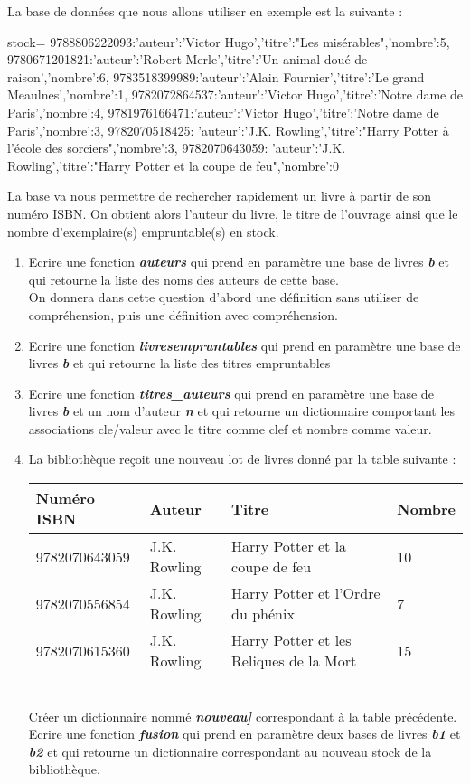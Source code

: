 \documentclass[12pt,french]{article}
\begin{document}
La base de données que nous allons utiliser en exemple est la suivante :
\small
\begin{tcolorbox}[enhanced,colback=blue!5!white,colframe=blue!75!black]	
\begin{pyverbatim}
stock={
9788806222093:{'auteur':'Victor Hugo','titre':"Les misérables",'nombre':5},
9780671201821:{'auteur':'Robert Merle','titre':'Un animal doué de raison','nombre':6},
9783518399989:{'auteur':'Alain Fournier','titre':'Le grand Meaulnes','nombre':1},
9782072864537:{'auteur':'Victor Hugo','titre':'Notre dame de Paris','nombre':4},
9781976166471:{'auteur':'Victor Hugo','titre':'Notre dame de Paris','nombre':3},               
9782070518425: {'auteur':'J.K. Rowling','titre':"Harry Potter à l'école des sorciers",'nombre':3},
9782070643059: {'auteur':'J.K. Rowling','titre':"Harry Potter et la coupe de feu",'nombre':0} 
}
\end{pyverbatim}
\end{tcolorbox}
\normalsize
La base va nous permettre de rechercher rapidement un livre à partir de son numéro ISBN. On obtient alors l'auteur du livre, le titre de l'ouvrage ainsi que le nombre d'exemplaire(s) empruntable(s) en stock.
\begin{enumerate}
\item Ecrire une fonction \textbf{\textsl{auteurs}} qui prend en paramètre une base de livres \textbf{\textsl{b}} et qui retourne la liste des noms des auteurs de cette base.\\
On donnera dans cette question d'abord une définition sans utiliser de compréhension, puis une définition avec compréhension.
\item Ecrire une fonction \textbf{\textsl{livresempruntables}} qui prend en paramètre une base de livres \textbf{\textsl{b}} et qui retourne la liste des titres empruntables
\item Ecrire une fonction \textbf{\textsl{titres\_auteurs}} qui prend en paramètre une base de livres \textbf{\textsl{b}} et un nom d'auteur \textbf{\textsl{n}} et qui retourne un dictionnaire comportant les associations cle/valeur avec le titre comme clef et nombre comme valeur.
\item La bibliothèque reçoit une nouveau lot de livres donné par la table suivante :\\
\begin{tabular}{|l|l|l|l|}
	\hline
	Numéro ISBN& 	Auteur &	Titre &	Nombre\\
	\hline
	9782070643059 &	J.K. Rowling &	Harry Potter et la coupe de feu &	10\\
	\hline
	9782070556854 &	J.K. Rowling &	Harry Potter et l'Ordre du phénix &	7\\
	\hline
	9782070615360 &	J.K. Rowling &	Harry Potter et les Reliques de la Mort &	15\\
	\hline
\end{tabular}\\
Créer un dictionnaire nommé \textbf{\textsl{nouveau]}} correspondant à la table précédente.
Ecrire une fonction \textbf{\textsl{fusion}} qui prend en paramètre deux bases de livres \textbf{\textsl{b1}} et \textbf{\textsl{b2}} et qui retourne un dictionnaire correspondant au nouveau stock de la bibliothèque.
\end{enumerate}
\end{document}
